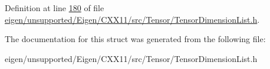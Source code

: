 Definition at line \hyperlink{eigen_2unsupported_2_eigen_2_c_x_x11_2src_2_tensor_2_tensor_dimension_list_8h_source_l00180}{180} of file \hyperlink{eigen_2unsupported_2_eigen_2_c_x_x11_2src_2_tensor_2_tensor_dimension_list_8h_source}{eigen/unsupported/\+Eigen/\+C\+X\+X11/src/\+Tensor/\+Tensor\+Dimension\+List.\+h}.



The documentation for this struct was generated from the following file\+:\begin{DoxyCompactItemize}
\item 
eigen/unsupported/\+Eigen/\+C\+X\+X11/src/\+Tensor/\+Tensor\+Dimension\+List.\+h\end{DoxyCompactItemize}
